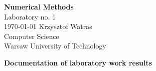 \documentclass[11pt]{article}
\begin{document}
\begin{titlepage}
   \begin{center}
       \vspace*{1cm}
       \textbf{\Huge Numerical Methods} \\
        \vspace{2.0cm}
        \huge{Laboratory no. 1}
         \vspace{.7cm}
       \huge{\\ \today}
        \vspace{3.0cm}
         \vspace{0.4cm}
        Krzysztof Watras\\
        \vspace{2 cm}   
       \small{Computer Science} \\  
       \vspace{0.2cm}       
       \small{Warsaw University of Technology} 
       \date{\today}
   \end{center}
\end{titlepage} 

\begin{center}
\textbf{\Large  Documentation of laboratory work results }\\ 
\end{center}
\end{document}
